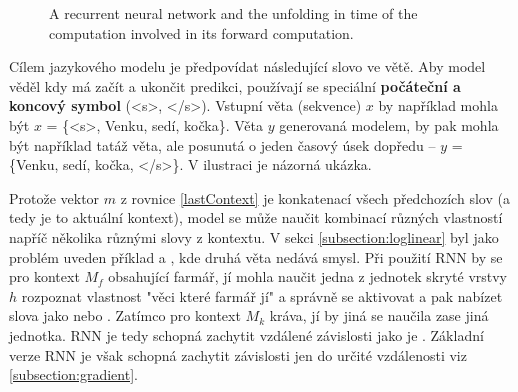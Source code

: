 \begin{figure}[h]
    \begin{center}
    \end{center}
	\caption{A recurrent neural network and the unfolding in time of the computation involved in its forward computation. }
	\label{img:rnnUnrolled}
\end{figure}

Cílem jazykového modelu je předpovídat následující slovo ve větě. Aby model věděl kdy má začít a ukončit predikci, používají se speciální \textbf{počáteční a koncový symbol} (<s>, </s>). Vstupní věta (sekvence) $x$ by například mohla být $x$ = \{<s>, Venku, sedí, kočka\}. Věta $y$ generovaná modelem, by pak mohla být například tatáž věta, ale posunutá o jeden časový úsek dopředu -- $y$ = \{Venku, sedí, kočka, </s>\}. V ilustraci  je názorná ukázka.

\begin{figure}
    \begin{center}
    \end{center}
	\caption{}
	\label{img:TODO}
\end{figure}



Protože vektor $m$ z rovnice \ref{lastContext} je konkatenací všech předchozích slov (a tedy je to aktuální kontext), model se může naučit kombinací různých vlastností napříč několika různými slovy z kontextu. V sekci \ref{subsection:loglinear} byl jako problém uveden příklad  a , kde druhá věta nedává smysl. Při použití RNN by se pro kontext $M_f$ obsahující {farmář, jí} mohla naučit jedna z jednotek skryté vrstvy $h$ rozpoznat vlastnost "věci které farmář jí" a správně se aktivovat a pak nabízet slova jako  nebo . Zatímco pro kontext $M_k$ {kráva, jí} by jiná se naučila zase jiná jednotka. RNN je tedy schopná zachytit vzdálené závislosti jako je . Základní verze RNN je však schopná zachytit závislosti jen do určité vzdálenosti viz \ref{subsection:gradient}.


